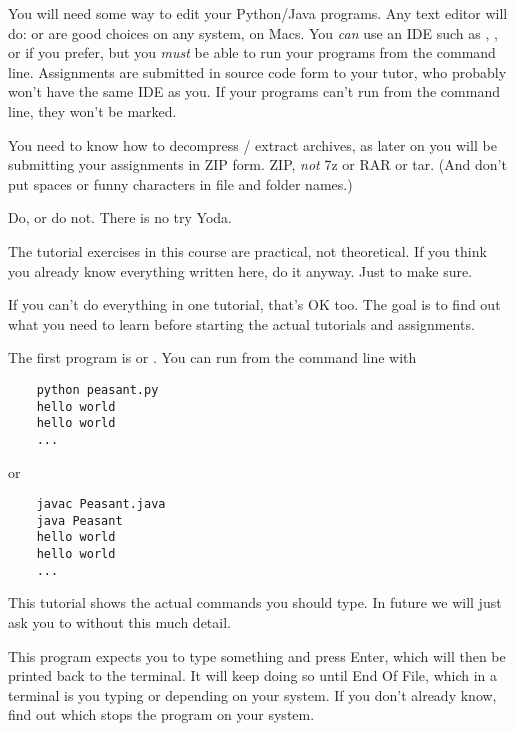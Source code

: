 You will need some way to edit your Python/Java programs. Any text editor will do:
 or  are good choices on any system,  on
Macs. You \emph{can} use an IDE such as , , or 
if you prefer, but you \emph{must} be able to run your programs from the command line.
Assignments are submitted in source code form to your tutor, who probably won't have
the same IDE as you. If your programs can't run from the command line, they won't be
marked.

You need to know how to decompress / extract  archives, as later on you will
be submitting your assignments in ZIP form. ZIP, \emph{not} 7z or RAR or tar.
(And don't put spaces or funny characters in file and folder names.)



\begin{IMPORTANT}
Do, or do not. There is no try \DSH Yoda.

The tutorial exercises in this course are practical, not theoretical. If you think
you already know everything written here, do it anyway. Just to make sure.

If you can't do everything in one tutorial, that's OK too. The goal is to find
out what you need to learn before starting the actual tutorials and assignments.
\end{IMPORTANT}

The first program is  or . You can run from the
command line with
\begin{CODE}\begin{verbatim}
    python peasant.py
    hello world
    hello world
    ...
\end{verbatim}\end{CODE}
or
\begin{CODE}\begin{verbatim}
    javac Peasant.java
    java Peasant
    hello world
    hello world
    ...
\end{verbatim}\end{CODE}

\begin{IMPORTANT}
This tutorial shows the actual commands you should type. In future we will just ask you
to  without this much detail.
\end{IMPORTANT}

This program expects you to type something and press Enter, which will then be printed
back to the terminal. It will keep doing so until End Of File, which in a terminal is
you typing  or  depending on your system. If you don't
already know, find out which stops the program on your system.

